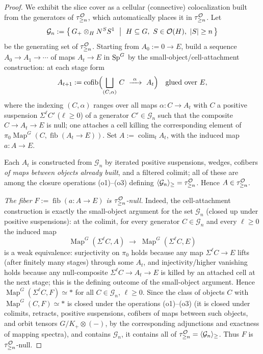 \begin{proof}
We exhibit the slice cover as a cellular (connective) colocalization built from
the generators of $\tau^{\mathcal{O}}_{\ge n}$, which automatically places it in
$\tau^{\mathcal{O}}_{\ge n}$. Let
\[
\mathcal G_n:=\bigl\{\,G_+\otimes_H N^S S^1\ \bigm|\ H\subseteq G,\ S\in\mathcal{O}(H),\ |S|\ge n\,\bigr\}
\]
be the generating set of $\tau^{\mathcal{O}}_{\ge n}$. Starting from $A_0:=0\to E$,
build a sequence $A_0\to A_1\to\cdots$ of maps $A_t\to E$ in $\mathrm{Sp}^G$ by the
small-object/cell-attachment construction: at each stage form
\[
A_{t+1}:=\operatorname{cofib}\Bigl(\bigsqcup_{(C,\alpha)}\,C\ \xrightarrow{\ \alpha\ }\ A_t\Bigr)
\quad\text{glued over }E,
\]
where the indexing $(C,\alpha)$ ranges over all maps $\alpha\colon C\to A_t$ with
$C$ a positive suspension $\Sigma^{\ell}C'$ ($\ell\ge 0$) of a generator
$C'\in\mathcal G_n$ such that the composite $C\to A_t\to E$ is null; one attaches
a cell killing the corresponding element of
$\pi_{0}\operatorname{Map}^G(C,\operatorname{fib}(A_t\to E))$. Set
$A:=\operatorname*{colim}_t A_t$, with the induced map $a\colon A\to E$.

Each $A_t$ is constructed from $\mathcal G_n$ by iterated positive suspensions,
wedges, cofibers \emph{of maps between objects already built}, and a filtered
colimit; all of these are among the closure operations (o1)--(o3) defining
$\langle\mathcal G_n\rangle_{\ge}=\tau^{\mathcal{O}}_{\ge n}$. Hence
$A\in\tau^{\mathcal{O}}_{\ge n}$.

\emph{The fiber $F:=\operatorname{fib}(a\colon A\to E)$ is
$\tau^{\mathcal{O}}_{\ge n}$-null.} Indeed, the cell-attachment construction is exactly
the small-object argument for the set $\mathcal G_n$ (closed up under positive
suspensions): at the colimit, for every generator $C\in\mathcal G_n$ and every
$\ell\ge0$ the induced map
\[
\operatorname{Map}^G(\Sigma^{\ell}C,A)\;\longrightarrow\;\operatorname{Map}^G(\Sigma^{\ell}C,E)
\]
is a weak equivalence: surjectivity on $\pi_0$ holds because any map
$\Sigma^\ell C\to E$ lifts (after finitely many stages) through some $A_t$, and
injectivity/higher vanishing holds because any null-composite $\Sigma^\ell C\to A_t\to E$
is killed by an attached cell at the next stage; this is the defining outcome of
the small-object argument. Hence $\operatorname{Map}^G(\Sigma^\ell C,F)\simeq\ast$
for all $C\in\mathcal G_n$, $\ell\ge0$. Since the class of objects $C$ with
$\operatorname{Map}^G(C,F)\simeq\ast$ is closed under the operations (o1)--(o3)
(it is closed under colimits, retracts, positive suspensions, cofibers of maps
between such objects, and orbit tensors $G/K_+\otimes(-)$, by the corresponding
adjunctions and exactness of mapping spectra), and contains $\mathcal G_n$, it
contains all of $\tau^{\mathcal{O}}_{\ge n}=\langle\mathcal G_n\rangle_{\ge}$. Thus $F$
is $\tau^{\mathcal{O}}_{\ge n}$-null.


\end{proof}
